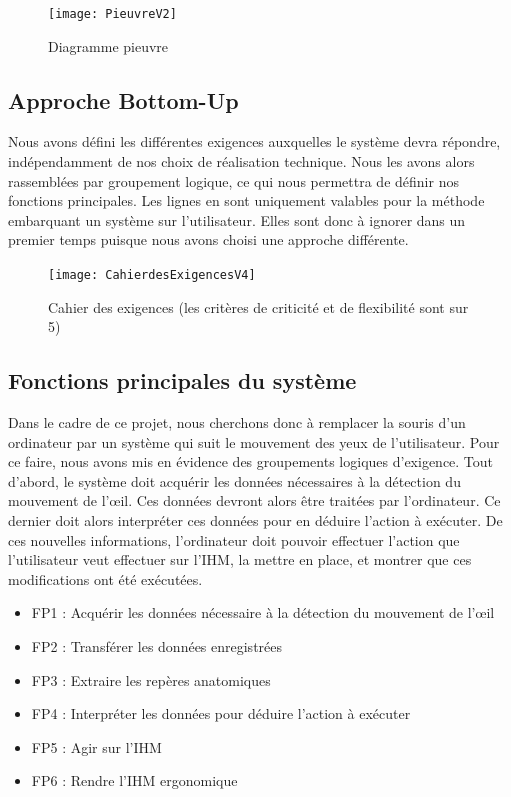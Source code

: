 \begin{figure}[H]
  \centering
  \texttt{[image: PieuvreV2]}
  \caption{Diagramme pieuvre}
  \label{fig:pieuvre}
\end{figure}

\subsection{Approche Bottom-Up}
Nous avons défini les différentes exigences auxquelles le système devra répondre, indépendamment de nos choix de réalisation technique. Nous les avons alors rassemblées par groupement logique, ce qui nous permettra de définir nos fonctions principales. Les lignes en {\color{sable}{\rule{0.5cm}{0.25cm}}} sont uniquement valables pour la méthode embarquant un système sur l'utilisateur. Elles sont donc à ignorer dans un premier temps puisque nous avons choisi une approche différente. 

\begin{figure}[H]
  \centering
  \texttt{[image: CahierdesExigencesV4]}
  \caption{Cahier des exigences (les critères de criticité et de flexibilité sont sur 5)}
  \label{fig:exigences}
\end{figure}

\subsection{Fonctions principales du système}

Dans le cadre de ce projet, nous cherchons donc à remplacer la souris d'un ordinateur par un système qui suit le mouvement des yeux de l'utilisateur. Pour ce faire, nous avons mis en évidence des groupements logiques d'exigence. Tout d'abord, le système doit acquérir les données nécessaires à la détection du mouvement de l'œil. Ces données devront alors être traitées par l'ordinateur. Ce dernier doit alors interpréter ces données pour en déduire l'action à exécuter. De ces nouvelles informations, l'ordinateur doit pouvoir effectuer l'action que l'utilisateur veut effectuer sur l'IHM, la mettre en place, et montrer que ces modifications ont été exécutées. 

\begin{itemize}[label=\textbullet,font=\color{black}]
\item FP1 : Acquérir les données nécessaire à la détection du mouvement de l'œil 
\item\colorbox{sable}{FP2 : Transférer les données enregistrées}
\item FP3 : Extraire les repères anatomiques
\item FP4 : Interpréter les données pour déduire l'action à exécuter 
\item FP5 : Agir sur l'IHM
\item FP6 : Rendre l'IHM ergonomique
\end{itemize}

